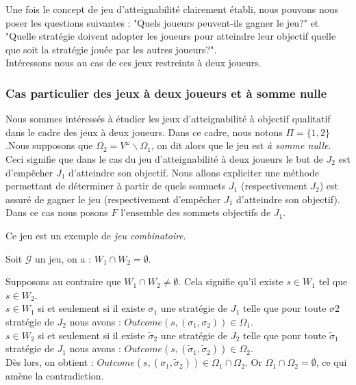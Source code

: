 	
	
	Une fois le concept de jeu d'atteignabilité clairement établi, nous pouvons nous poser les questions suivantes : "Quels joueurs peuvent-ils gagner le jeu?" et "Quelle stratégie doivent adopter les joueurs pour atteindre leur objectif quelle que soit la stratégie jouée par les autres joueurs?". \\
	
	Intéressons nous au cas de ces jeux restreints à deux joueurs.
	
	\subsubsection{Cas particulier des jeux à deux joueurs et à somme nulle}
	Nous sommes intéressés à étudier les jeux d'atteignabilité à objectif qualitatif dans le cadre des jeux à deux joueurs. Dans ce cadre, nous notons $\Pi = \{1,2\}$.Nous supposons que $\Omega _{2} = V^{\omega}\backslash \Omega _{1}$, on dit alors que le jeu est \textit{à somme nulle}. Ceci signifie que dans le cas du jeu d'atteignabilité à deux joueurs le but de $J_{2}$ est d'empêcher $J_{1}$ d'atteindre son objectif. Nous allons expliciter une méthode permettant de déterminer à partir de quels sommets $J_{1}$ (respectivement $J_{2}$) est assuré de gagner le jeu (respectivement d'empêcher $J_{1}$ d'atteindre son objectif). Dans ce cas nous posons $F$ l'ensemble des sommets objectifs de $J_{1}$.
	
	\begin{rem}
		Ce jeu est un exemple de \textit{jeu combinatoire}.
	\end{rem}

	\label{Wempty}
	\begin{propriete}
		Soit $\mathcal{G}$ un jeu, on a : $W_{1}\cap W_{2} = \emptyset$.
	\end{propriete}
	\begin{demonstration}
		Supposons au contraire que $W_{1}\cap W_{2} \neq \emptyset$. Cela signifie qu'il existe $s \in W_{1}$ tel que $s \in W_{2}$.\\
		$s \in W_{1}$ si et seulement si il existe $\sigma _{1}$ une stratégie de $J_{1}$ telle que pour toute $\sigma {2}$ stratégie de $J_{2}$ nous avons : $Outcome(s,(\sigma _{1},\sigma _{2})) \in \Omega _{1}$.\\
		$s \in W_{2}$ si et seulement si il existe $\tilde{\sigma} _{2}$ une stratégie de $J_{2}$ telle que pour toute $\tilde{\sigma}_{1}$ stratégie de $J_{1}$ nous avons : $Outcome(s,(\tilde{\sigma}_{1},\tilde{\sigma}_{2})) \in \Omega _{2}$.\\
		Dès lors, on obtient : $Outcome(s,(\sigma _{1},\tilde{\sigma}_{2})) \in \Omega _{1} \cap \Omega _{2}$. Or $\Omega _{1} \cap \Omega _{2} = \emptyset$, ce qui amène la contradiction.\\
	\end{demonstration}

